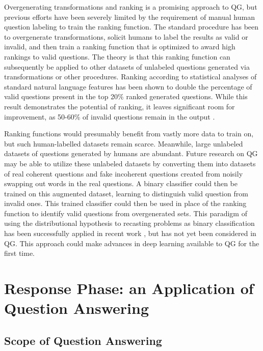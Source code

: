 Overgenerating transformations and ranking is a promising approach to QG, but previous efforts have been severely limited by the requirement of manual human question labeling to train the ranking function. The standard procedure has been to overgenerate transformations, solicit humans to label the results as valid or invalid, and then train a ranking function that is optimized to award high rankings to valid questions. The theory is that this ranking function can subsequently be applied to other datasets of unlabeled questions generated via transformations or other procedures. Ranking according to statistical analyses of standard natural language features has been shown to double the percentage of valid questions present in the top 20\% ranked generated questions. While this result demonstrates the potential of ranking, it leaves significant room for improvement, as 50-60\% of invalid questions remain in the output \cite{heilman2011automatic}. 

Ranking functions would presumably benefit from vastly more data to train on, but such human-labelled datasets remain scarce. Meanwhile, large unlabeled datasets of questions generated by humans are abundant. Future research on QG may be able to utilize these unlabeled datasets by converting them into datasets of real coherent questions and fake incoherent questions created from noisily swapping out words in the real questions. A binary classifier could then be trained on this augmented dataset, learning to distinguish valid question from invalid ones. This trained classifier could then be used in place of the ranking function to identify valid questions from overgenerated sets. This paradigm of using the distributional hypothesis to recasting problems as binary classification has been successfully applied in recent work \cite{collobert2011natural}, but has not yet been considered in QG. This approach could make advances in deep learning available to QG for the first time. 

\section{Response Phase: an Application of Question Answering}

\subsection{Scope of Question Answering}

